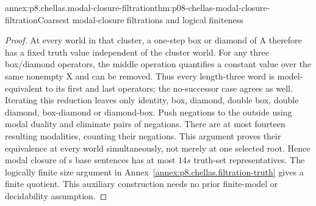 \begin{annexitem}{annex:p8.chellas.modal-closure-filtration}{thm:p08-chellas-modal-closure-filtration}{Coarsest modal-closure filtrations and logical finiteness}
\begin{proof}
At every world in that cluster, a one-step box or diamond of A
therefore has a fixed truth value independent of the cluster world.
For any three box/diamond operators, the middle operation quantifies
a constant value over the same nonempty X and can be removed.
Thus every length-three word is model-equivalent to its first and
last operators; the no-successor case agrees as well. Iterating
this reduction leaves only identity, box, diamond, double box,
double diamond, box-diamond or diamond-box. Push negations to the
outside using modal duality and eliminate pairs of negations.
There are at most fourteen resulting modalities, counting their
negations. This argument proves their equivalence at every world
simultaneously, not merely at one selected root. Hence modal closure
of s base sentences has at most \(14s\) truth-set representatives.
The logically finite size argument in
Annex~\ref{annex:p8.chellas.filtration-truth} gives a finite quotient.
This auxiliary construction needs no prior finite-model or
decidability assumption.
\end{proof}
\end{annexitem}

